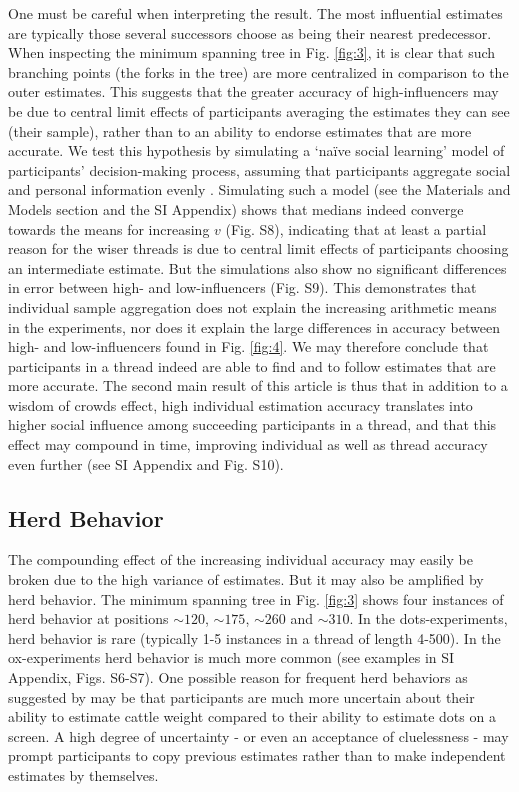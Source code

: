 \documentclass[9pt,twocolumn,twoside,lineno]{article}
\begin{document}
One must be careful when interpreting the result. The most influential estimates are typically those several successors choose as being their nearest predecessor. When inspecting the minimum spanning tree in Fig. \ref{fig:3}, it is clear that such branching points (the forks in the tree) are more centralized in comparison to the outer estimates. This suggests that the greater accuracy of high-influencers may be due to central limit effects of participants averaging the estimates they can see (their sample), rather than to an ability to endorse estimates that are more accurate. We test this hypothesis by simulating a ‘naïve social learning’ model of participants’ decision-making process, assuming that participants aggregate social and personal information evenly \cite{degroot1974reaching, golub2010naive}. Simulating such a model (see the Materials and Models section and the SI Appendix) shows that medians indeed converge towards the means for increasing $v$ (Fig. S8), indicating that at least a partial reason for the wiser threads is due to central limit effects of participants choosing an intermediate estimate. But the simulations also show no significant differences in error between high- and low-influencers (Fig. S9). This demonstrates that individual sample aggregation does not explain the increasing arithmetic means in the experiments, nor does it explain the large differences in accuracy between high- and low-influencers found in Fig. \ref{fig:4}. We may therefore conclude that participants in a thread indeed are able to find and to follow estimates that are more accurate. The second main result of this article is thus that in addition to a wisdom of crowds effect, high individual estimation accuracy translates into higher social influence among succeeding participants in a thread, and that this effect may compound in time, improving individual as well as thread accuracy even further (see SI Appendix and Fig. S10).

\subsection*{Herd Behavior}
The compounding effect of the increasing individual accuracy may easily be broken due to the high variance of estimates. But it may also be amplified by herd behavior. The minimum spanning tree in Fig. \ref{fig:3} shows four instances of herd behavior at positions $\sim 120$, $\sim 175$, $\sim 260$ and $\sim 310$. In the dots-experiments, herd behavior is rare (typically 1-5 instances in a thread of length 4-500). In the ox-experiments herd behavior is much more common (see examples in SI Appendix, Figs. S6-S7). One possible reason for frequent herd behaviors as suggested by \cite{navajas2018diversity} may be that participants are much more uncertain about their ability to estimate cattle weight compared to their ability to estimate dots on a screen. A high degree of uncertainty - or even an acceptance of cluelessness - may prompt participants to copy previous estimates rather than to make independent estimates by themselves. 
\end{document}
